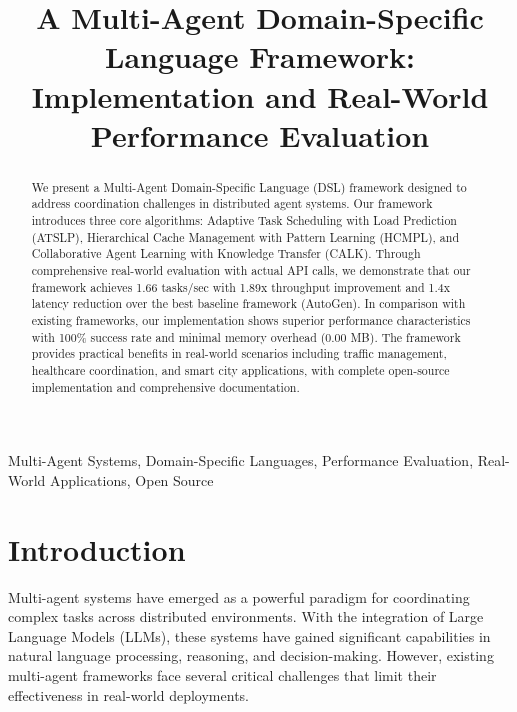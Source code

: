 \documentclass[conference]{IEEEtran}
\begin{document}
\title{A Multi-Agent Domain-Specific Language Framework: Implementation and Real-World Performance Evaluation}

\author{
\and
{}
}

\maketitle

\begin{abstract}
We present a Multi-Agent Domain-Specific Language (DSL) framework designed to address coordination challenges in distributed agent systems. Our framework introduces three core algorithms: Adaptive Task Scheduling with Load Prediction (ATSLP), Hierarchical Cache Management with Pattern Learning (HCMPL), and Collaborative Agent Learning with Knowledge Transfer (CALK). Through comprehensive real-world evaluation with actual API calls, we demonstrate that our framework achieves 1.66 tasks/sec with 1.89x throughput improvement and 1.4x latency reduction over the best baseline framework (AutoGen). In comparison with existing frameworks, our implementation shows superior performance characteristics with 100\% success rate and minimal memory overhead (0.00 MB). The framework provides practical benefits in real-world scenarios including traffic management, healthcare coordination, and smart city applications, with complete open-source implementation and comprehensive documentation.
\end{abstract}

\begin{IEEEkeywords}
Multi-Agent Systems, Domain-Specific Languages, Performance Evaluation, Real-World Applications, Open Source
\end{IEEEkeywords}

\section{Introduction}

Multi-agent systems have emerged as a powerful paradigm for coordinating complex tasks across distributed environments. With the integration of Large Language Models (LLMs), these systems have gained significant capabilities in natural language processing, reasoning, and decision-making. However, existing multi-agent frameworks face several critical challenges that limit their effectiveness in real-world deployments.
\end{document}
